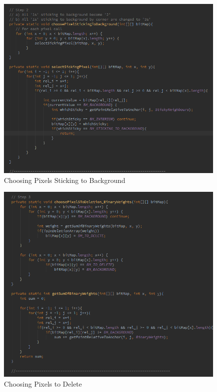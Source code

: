 \documentclass{article}
\begin{document}
%
%
\begin{figure}[H]
\centering

  \includegraphics[width=0.9\linewidth]{res/kmm/stick_bg.png}

\caption{Choosing Pixels Sticking to Background}
\label{fig:kmm_stick_bg}
\end{figure}


%
%
\begin{figure}[H]
\centering

  \includegraphics[width=0.9\linewidth]{res/kmm/binary_weights.png}

\caption{Choosing Pixels to Delete}
\label{fig:kmm_binary_weights}
\end{figure}
\end{document}
